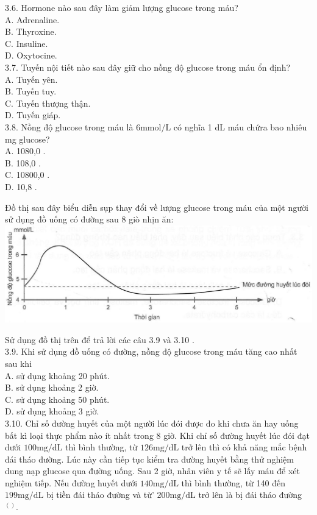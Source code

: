 \documentclass[10pt]{article}
\begin{document}
3.6. Hormone nào sau đây làm giảm lượng glucose trong máu?\\
A. Adrenaline.\\
B. Thyroxine.\\
C. Insuline.\\
D. Oxytocine.\\
3.7. Tuyến nội tiết nào sau đây giữ cho nồng độ glucose trong máu ổn định?\\
A. Tuyến yên.\\
B. Tuyến tuy.\\
C. Tuyến thượng thận.\\
D. Tuyến giáp.\\
3.8. Nồng độ glucose trong máu là $6 \mathrm{mmol} / \mathrm{L}$ có nghĩa 1 dL máu chứra bao nhiêu mg glucose?\\
A. 1080,0 .\\
B. 108,0 .\\
C. 10800,0 .\\
D. 10,8 .

Đồ thị sau đây biểu diễn sụp thay đổi về lượng glucose trong máu của một người sử dụng đồ uống có đường sau 8 giò nhịn ăn:\\
\includegraphics[max width=\textwidth, center]{2025_10_23_de6f5713836e4e91b3c8g-022}

Sử dụng đồ thị trên để trả lời các câu 3.9 và 3.10 .\\
3.9. Khi sử dụng đồ uống có đường, nồng độ glucose trong máu tăng cao nhất sau khi\\
A. sử dụng khoảng 20 phút.\\
B. sử dụng khoảng 2 giờ.\\
C. sử dụng khoảng 50 phút.\\
D. sử dụng khoảng 3 giờ.\\
3.10. Chỉ số đường huyết của một người lúc đói được đo khi chưa ăn hay uống bất kì loại thực phẩm nào ít nhất trong 8 giờ. Khi chỉ số đường huyết lúc đói đạt dưới $100 \mathrm{mg} / \mathrm{dL}$ thì bình thường, từ $126 \mathrm{mg} / \mathrm{dL}$ trở lên thì có khả năng mắc bệnh đái tháo đường. Lúc này cần tiếp tục kiểm tra đường huyết bằng thử nghiệm dung nạp glucose qua đường uống. Sau 2 giờ, nhân viên y tế sẽ lấy máu để xét nghiệm tiếp. Nếu đường huyết dưới $140 \mathrm{mg} / \mathrm{dL}$ thì bình thường, từ 140 đến $199 \mathrm{mg} / \mathrm{dL}$ bị tiền đái tháo đường và từ' $200 \mathrm{mg} / \mathrm{dL}$ trở lên là bị đái tháo đường ${ }^{()}$.
\end{document}
